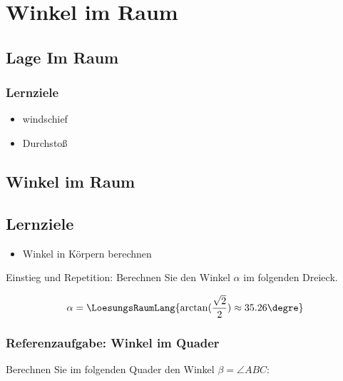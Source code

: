\section{Winkel im Raum}
\sectuntertitel{}


\subsection{Lage Im Raum}

\subsubsection*{Lernziele}
\begin{itemize}
\item windschief
\item Durchstoß
\end{itemize}

\newpage


\subsection{Winkel im Raum}


\subsection*{Lernziele}
\begin{itemize}
\item Winkel in Körpern berechnen
\end{itemize}


Einstieg und Repetition: Berechnen Sie den Winkel $\alpha$ im folgenden Dreieck.


$$\alpha= \LoesungsRaumLang{ \arctan(\frac{\sqrt2}2) \approx 35.26\degre  }$$

\newpage



\subsubsection{Referenzaufgabe: Winkel im Quader}

Berechnen Sie im folgenden Quader den Winkel $\beta = \angle ABC$:

